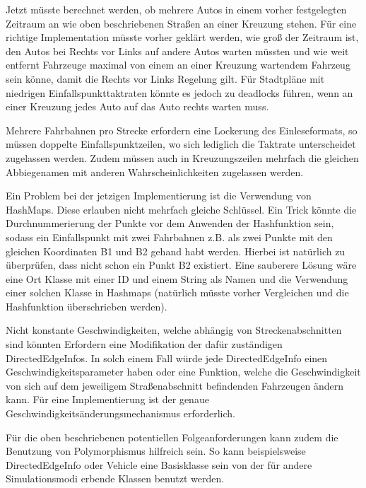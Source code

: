Jetzt müsste berechnet werden, ob mehrere Autos in einem vorher festgelegten Zeitraum an wie oben beschriebenen Straßen an einer Kreuzung stehen.
Für eine richtige Implementation müsste vorher geklärt werden, wie groß der Zeitraum ist, den Autos bei Rechts vor Links auf andere Autos warten müssten
und wie weit entfernt Fahrzeuge maximal von einem an einer Kreuzung wartendem Fahrzeug sein könne, damit die Rechts vor Links Regelung gilt. 
Für Stadtpläne mit niedrigen Einfallspunkttaktraten könnte es jedoch zu deadlocks führen, wenn an einer Kreuzung jedes Auto auf das Auto rechts warten muss.

Mehrere Fahrbahnen pro Strecke erfordern eine Lockerung des Einleseformats,
so müssen doppelte Einfallspunktzeilen, wo sich lediglich die Taktrate unterscheidet zugelassen werden.
Zudem müssen auch in Kreuzungszeilen mehrfach die gleichen Abbiegenamen mit anderen Wahrscheinlichkeiten zugelassen werden.

Ein Problem bei der jetzigen Implementierung ist die Verwendung von HashMaps. Diese erlauben nicht mehrfach gleiche Schlüssel.
Ein Trick könnte die Durchnummerierung der Punkte vor dem Anwenden der Hashfunktion sein, sodass ein Einfallspunkt mit zwei
Fahrbahnen z.B. als zwei Punkte mit den gleichen Koordinaten B1 und B2 gehand habt werden.
Hierbei ist natürlich zu überprüfen, dass nicht schon ein Punkt B2 existiert. Eine sauberere Lösung wäre eine Ort Klasse mit einer ID und einem String als Namen und die Verwendung einer solchen
Klasse in Hashmaps (natürlich müsste vorher Vergleichen und die Hashfunktion überschrieben werden).

Nicht konstante Geschwindigkeiten, welche abhängig von Streckenabschnitten sind könnten Erfordern eine Modifikation der dafür zuständigen DirectedEdgeInfos.
In solch einem Fall würde jede DirectedEdgeInfo einen Geschwindigkeitsparameter haben oder eine Funktion, welche die Geschwindigkeit von sich auf dem jeweiligem
Straßenabschnitt befindenden Fahrzeugen ändern kann.
Für eine Implementierung ist der genaue Geschwindigkeitsänderungsmechanismus erforderlich.

Für die oben beschriebenen potentiellen Folgeanforderungen kann zudem die Benutzung von Polymorphismus hilfreich sein.
So kann beispielsweise DirectedEdgeInfo oder Vehicle eine Basisklasse sein von der für andere Simulationsmodi erbende Klassen benutzt werden.



